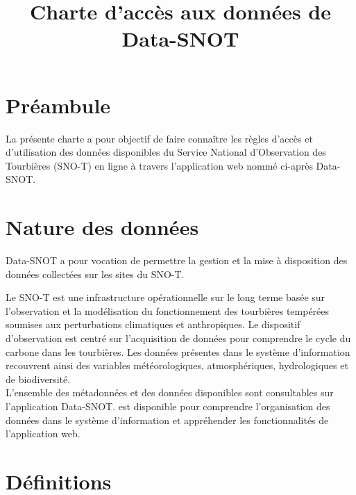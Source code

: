 \documentclass[]{article}
\title{Charte d'accès aux données de Data-SNOT}
\date{}
\newcommand{\mhref}[3][blue]{\href{#2}{\color{#1}{#3}}}%
\begin{document}
	\maketitle
	
\section{Préambule}

La présente charte a pour objectif de faire connaître les règles d'accès et d'utilisation des données disponibles du Service National d'Observation des Tourbières (SNO-T) en ligne à travers l’application web \mhref{https://data-snot.cnrs.fr/}{data-snot.cnrs.fr} nommé ci-après \og{}Data-SNOT\fg{}.

\section{Nature des données}

Data-SNOT a pour vocation de permettre la gestion et la mise à disposition des données collectées sur les sites du SNO-T.

Le SNO-T est une infrastructure opérationnelle sur le long terme basée sur l’observation et la modélisation du fonctionnement des tourbières tempérées soumises aux perturbations climatiques et anthropiques. Le dispositif d’observation est centré sur l'acquisition de données pour comprendre le cycle du carbone dans les tourbières. Les données présentes dans le système d’information recouvrent ainsi des variables météorologiques, atmosphériques, hydrologiques et de biodiversité.\\

L’ensemble des métadonnées et des données disponibles sont consultables sur l'application Data-SNOT. \mhref{https://sourcesup.renater.fr/si-snot/}{Une documentation en ligne} est disponible pour comprendre l'organisation des données dans le système d'information et appréhender les fonctionnalités de l'application web. 

\section{Définitions}
\end{document}
